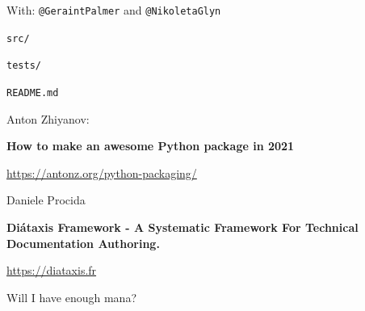 \documentclass{beamer}
\begin{document}
    \begin{frame}
        \begin{center}
            \scalebox{.7}{}
        \end{center}
        \tiny{With: \texttt{@GeraintPalmer} and \texttt{@NikoletaGlyn}}
    \end{frame}

    \begin{frame}
        \Huge
        \begin{center}
            \texttt{src/}
        \end{center}
    \end{frame}

    \begin{frame}
        \Huge
        \begin{center}
            \texttt{tests/}
        \end{center}
    \end{frame}

    \begin{frame}
        \Huge
        \begin{center}
            \texttt{README.md}
        \end{center}
    \end{frame}

    \begin{frame}
        \large
        Anton Zhiyanov:
        \begin{center}
            \textbf{How to make an awesome Python package in 2021}
        \end{center}
        \tiny
        \hfill
        \url{https://antonz.org/python-packaging/}
    \end{frame}

    \begin{frame}
        \large
        Daniele Procida
        \begin{center}
            \textbf{Diátaxis Framework - A Systematic Framework For Technical Documentation Authoring.}
        \end{center}
        \tiny
        \hfill
        \url{https://diataxis.fr}
    \end{frame}

    \begin{frame}
        \begin{center}
            \Huge
            Will I have enough mana?
        \end{center}
    \end{frame}
\end{document}
